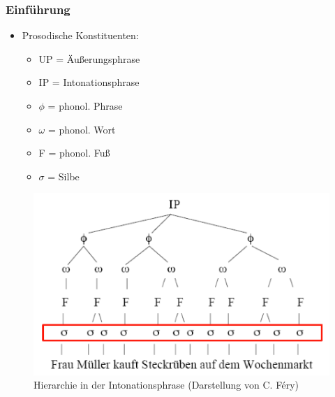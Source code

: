 \begin{frame}
\frametitle{Einführung}


\begin{itemize}
	\item Prosodische Konstituenten:
	\begin{multicols}{2}
	\begin{itemize}
		\item UP = Äußerungsphrase
		\item IP = Intonationsphrase
		\item $\phi$ = phonol. Phrase
\columnbreak
		\item $\omega$ = phonol. Wort
		\item F = phonol. Fuß
		\item \alert{$\sigma$ = Silbe}
	\end{itemize}
	\end{multicols}
\end{itemize}

\begin{figure}[b]
	\includegraphics[scale=0.32]{material/03bHierarchieIntonationsphrase}
	\caption{Hierarchie in der Intonationsphrase (Darstellung von C. Féry)}
	\label{Zeichen1}
\end{figure}

\end{frame}




